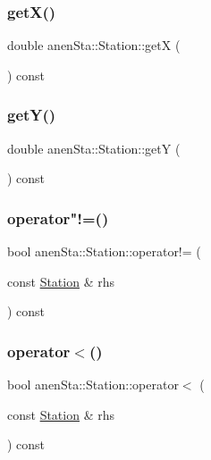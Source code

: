 \subsubsection{\texorpdfstring{get\+X()}{getX()}}
{\footnotesize\ttfamily double anen\+Sta\+::\+Station\+::getX (\begin{DoxyParamCaption}{ }\end{DoxyParamCaption}) const}

\mbox{\label{classanen_sta_1_1_station_adefc7f1b643ef4542580fd05fbf96b60}} 
\subsubsection{\texorpdfstring{get\+Y()}{getY()}}
{\footnotesize\ttfamily double anen\+Sta\+::\+Station\+::getY (\begin{DoxyParamCaption}{ }\end{DoxyParamCaption}) const}

\mbox{\label{classanen_sta_1_1_station_a1d1825af1c6c219cebd12f836973159e}} 
\subsubsection{\texorpdfstring{operator"!=()}{operator!=()}}
{\footnotesize\ttfamily bool anen\+Sta\+::\+Station\+::operator!= (\begin{DoxyParamCaption}\item[{const \mbox{\hyperlink{classanen_sta_1_1_station}{Station}} \&}]{rhs }\end{DoxyParamCaption}) const}

\mbox{\label{classanen_sta_1_1_station_ae75bae686937d9b5fc9b75ca7f6133fc}} 
\subsubsection{\texorpdfstring{operator$<$()}{operator<()}}
{\footnotesize\ttfamily bool anen\+Sta\+::\+Station\+::operator$<$ (\begin{DoxyParamCaption}\item[{const \mbox{\hyperlink{classanen_sta_1_1_station}{Station}} \&}]{rhs }\end{DoxyParamCaption}) const}

